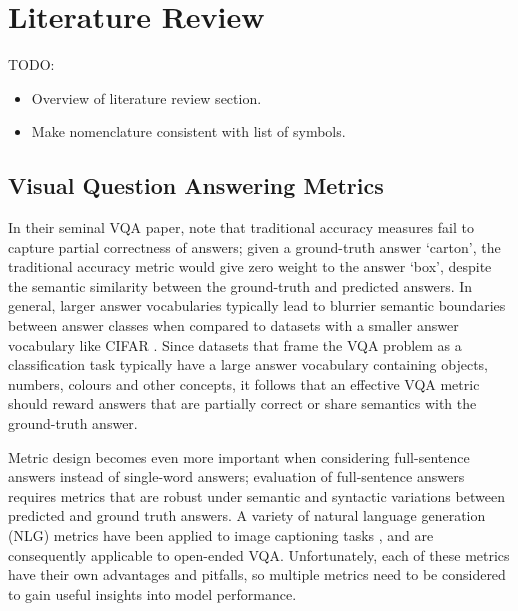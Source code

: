 \chapter{Literature Review}
\label{chapter:literature}

{\color{red} TODO:
\begin{itemize}
    \item Overview of literature review section.
    \item Make nomenclature consistent with list of symbols.
\end{itemize}}


\section{Visual Question Answering Metrics}

In their seminal VQA paper, \citeauthor{malinowski2014multiworld} \cite{malinowski2014multiworld} note that traditional accuracy measures fail to capture partial correctness of answers; given a ground-truth answer `carton', the traditional accuracy metric would give zero weight to the answer `box', despite the semantic similarity between the ground-truth and predicted answers. In general, larger answer vocabularies typically lead to blurrier semantic boundaries between answer classes when compared to datasets with a smaller answer vocabulary like CIFAR \cite{krizhevsky2009learning}. Since datasets that frame the VQA problem as a classification task typically have a large answer vocabulary containing objects, numbers, colours and other concepts, it follows that an effective VQA metric should reward answers that are partially correct or share semantics with the ground-truth answer.

Metric design becomes even more important when considering full-sentence answers instead of single-word answers; evaluation of full-sentence answers requires metrics that are robust under semantic and syntactic variations between predicted and ground truth answers. A variety of natural language generation (NLG) metrics \cite{papineni2002bleu, lin2004rouge, banerjee2005meteor, vedantam2015cider} have been applied to image captioning tasks \cite{chen2015microsoft}, and are consequently applicable to open-ended VQA. Unfortunately, each of these metrics have their own advantages and pitfalls, so multiple metrics need to be considered to gain useful insights into model performance.


